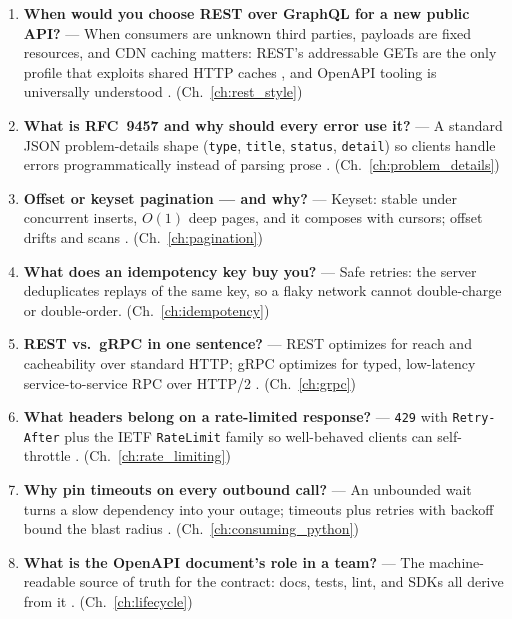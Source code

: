 \begin{enumerate}[label=\textbf{Q\arabic*.}, leftmargin=3em]
  \item \textbf{When would you choose REST over GraphQL for a new public
        API?} --- When consumers are unknown third parties, payloads are
        fixed resources, and CDN caching matters: REST's addressable GETs are
        the only profile that exploits shared HTTP caches \cite{rfc9110}, and
        OpenAPI tooling is universally understood \cite{openapi31}.
        (Ch.~\ref{ch:rest_style})
  \item \textbf{What is RFC~9457 and why should every error use it?} ---
        A standard JSON problem-details shape (\texttt{type},
        \texttt{title}, \texttt{status}, \texttt{detail}) so clients handle
        errors programmatically instead of parsing prose \cite{rfc9457}.
        (Ch.~\ref{ch:problem_details})
  \item \textbf{Offset or keyset pagination --- and why?} --- Keyset:
        stable under concurrent inserts, $O(1)$ deep pages, and it composes
        with cursors; offset drifts and scans \cite{rfc8288}.
        (Ch.~\ref{ch:pagination})
  \item \textbf{What does an idempotency key buy you?} --- Safe retries:
        the server deduplicates replays of the same key, so a flaky network
        cannot double-charge or double-order. (Ch.~\ref{ch:idempotency})
  \item \textbf{REST vs.\ gRPC in one sentence?} --- REST optimizes for
        reach and cacheability over standard HTTP; gRPC optimizes for typed,
        low-latency service-to-service RPC over HTTP/2
        \cite{rfc9113,grpcdocs}. (Ch.~\ref{ch:grpc})
  \item \textbf{What headers belong on a rate-limited response?} ---
        \texttt{429} with \texttt{Retry-After} plus the IETF
        \texttt{RateLimit} family so well-behaved clients can self-throttle
        \cite{ietf_ratelimit_headers}. (Ch.~\ref{ch:rate_limiting})
  \item \textbf{Why pin timeouts on every outbound call?} --- An unbounded
        wait turns a slow dependency into your outage; timeouts plus retries
        with backoff bound the blast radius \cite{nygard2018releaseit}.
        (Ch.~\ref{ch:consuming_python})
  \item \textbf{What is the OpenAPI document's role in a team?} --- The
        machine-readable source of truth for the contract: docs, tests,
        lint, and SDKs all derive from it \cite{openapi31}.
        (Ch.~\ref{ch:lifecycle})
\end{enumerate}

